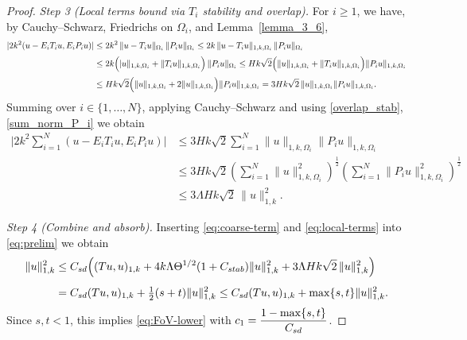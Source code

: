 \documentclass[preprint,3p,times]{elsarticle}
\newcommand{\Cstab}{C_{\textup{\textsf{stab}}}}
\newcommand{\Csd}{C_{\textup{\textsf{sd}}}}
\theoremstyle{definition}
\numberwithin{equation}{section}
\begin{document}
\begin{proof}
\noindent\textit{Step 3 (Local terms bound via $T_i$ stability and overlap).}
For $i\ge 1$, we have, by Cauchy--Schwarz, Friedrichs on $\Omega_i$, and Lemma~\ref{lemma_3_6},
\begin{align*}
	|2 k^2(u-E_i T_i u, E_i P_i u)|
	&\le 2 k^2 \,\|u- T_i u\|_{\Omega_i}\,\|P_i u\|_{\Omega_i}
	\le 2 k \,\|u- T_i u\|_{1, k, \Omega_i}\,\|P_i u\|_{\Omega_i}
	\\[0.5ex]
	&\le 2 k \Bigl(|u\|_{1, k, \Omega_i}+\|T_i u\|_{1, k, \Omega_i}\Bigr)\,\|P_i u\|_{\Omega_i}
	\le H k \sqrt{2}  \Bigl(\|u\|_{1, k, \Omega_i}+\|T_i u\|_{1, k, \Omega_i}\Bigr)\|P_i u\|_{1, k, \Omega_i}
    \\[0.5ex]
	&\le H k \sqrt{2}  \Bigl(\|u\|_{1, k, \Omega_i}+2 \| u\|_{1, k, \Omega_i}\Bigr)\|P_i u\|_{1, k, \Omega_i}
	= 3 H k \sqrt{2}\, \|u\|_{1, k, \Omega_i} \|P_i u\|_{1, k, \Omega_i}.
\end{align*}
Summing over $i\in\{1,\ldots,N\}$, applying Cauchy--Schwarz and using \eqref{overlap_stab}, \eqref{sum_norm_P_i} we obtain
\begin{align}
	\Bigg|2 k^2\sum_{i=1}^N (u-E_i T_i u, E_i P_i u)\bigg|
	&\le 3Hk\sqrt{2} \sum_{i=1}^N \|u\|_{1,k,\Omega_i} \|P_i u\|_{1,k,\Omega_i}
	\nonumber\\[0.5ex]
	&\le 3Hk\sqrt{2} \left( \sum_{i=1}^N \|u\|_{1, k, \Omega_i}^2 \right)^\frac{1}{2} \left( \sum_{i=1}^N  \|P_i u\|_{1, k, \Omega_i}^2 \right)^\frac{1}{2}
	\nonumber\\[0.5ex]
	&\le 3\Lambda Hk\sqrt{2}\, \|u\|_{1,k}^2.
	\label{eq:local-terms}
\end{align}



\noindent\textit{Step 4 (Combine and absorb).}
Inserting \eqref{eq:coarse-term} and \eqref{eq:local-terms} into \eqref{eq:prelim} we obtain
\begin{align*}
	\|u\|_{1,k}^2 &\le \Csd\Bigl((Tu,u)_{1,k} + 4k\Lambda\Theta^{1/2}(1+\Cstab)\|u\|_{1,k}^2 + 3\Lambda Hk\sqrt{2}\,\|u\|_{1,k}^2\Bigr)
	\\[1ex]
	&= \Csd(Tu,u)_{1,k} + \tfrac{1}{2}(s+t)\|u\|_{1,k}^2
	\le \Csd(Tu,u)_{1,k} + \max\{s,t\}\|u\|_{1,k}^2.
\end{align*}
Since $s,t<1$, this implies \eqref{eq:FoV-lower} with $c_1=\dfrac{1-\max\{s,t\}}{\Csd}$.


\end{proof}
\end{document}
